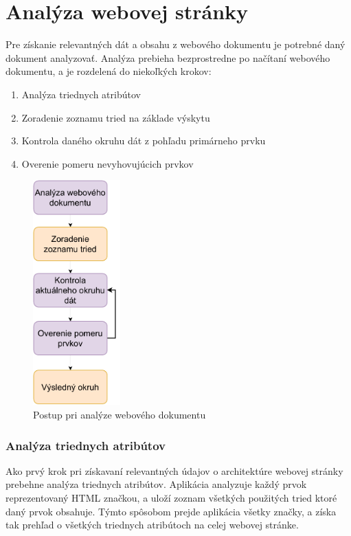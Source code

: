  \newpage
 \section{Analýza webovej stránky}
 
 Pre získanie relevantných dát a obsahu z webového dokumentu je potrebné daný dokument analyzovať. Analýza prebieha bezprostredne po načítaní webového dokumentu, a je rozdelená do niekoľkých krokov:
 
 \begin{enumerate}
     \item Analýza triednych atribútov
     \item Zoradenie zoznamu tried na základe výskytu
     \item Kontrola daného okruhu dát z pohľadu primárneho prvku
     \item Overenie pomeru nevyhovujúcich prvkov
 \end{enumerate}
 
 \begin{figure}[hbt]
	\centering
	\includegraphics[width=0.3\textwidth]{obrazky-figures/analysis.pdf}
	\caption{Postup pri analýze webového dokumentu}
	\label{analysispdf}
\end{figure}

\newpage

\subsubsection{Analýza triednych atribútov}

Ako prvý krok pri získavaní relevantných údajov o architektúre webovej stránky prebehne analýza triednych atribútov. Aplikácia analyzuje každý prvok reprezentovaný HTML značkou, a uloží zoznam všetkých použitých tried ktoré daný prvok obsahuje. Týmto spôsobom prejde aplikácia všetky značky, a získa tak prehľad o všetkých triednych atribútoch na celej webovej stránke.

